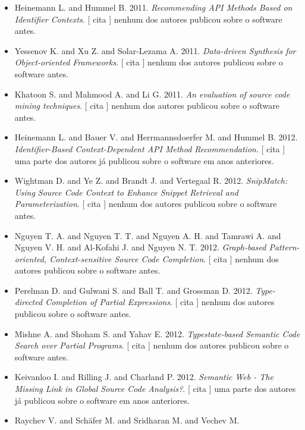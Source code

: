 \begin{itemize}
      [
          cita
      ]
nenhum dos autores publicou sobre o software antes.
\item Heinemann L. and Hummel B.
      2011.
        \textit{ Recommending API Methods Based on Identifier Contexts}.
      [
          cita
      ]
nenhum dos autores publicou sobre o software antes.
\item Yessenov K. and Xu Z. and Solar-Lezama A.
      2011.
        \textit{ Data-driven Synthesis for Object-oriented Frameworks}.
      [
          cita
      ]
nenhum dos autores publicou sobre o software antes.
\item Khatoon S. and Mahmood A. and Li G.
      2011.
        \textit{ An evaluation of source code mining techniques}.
      [
          cita
      ]
nenhum dos autores publicou sobre o software antes.
\item Heinemann L. and Bauer V. and Herrmannsdoerfer M. and Hummel B.
      2012.
        \textit{ Identifier-Based Context-Dependent API Method Recommendation}.
      [
          cita
      ]
uma parte dos autores já publicou sobre o software em anos anteriores.
\item Wightman D. and Ye Z. and Brandt J. and Vertegaal R.
      2012.
        \textit{ SnipMatch: Using Source Code Context to Enhance Snippet Retrieval and Parameterization}.
      [
          cita
      ]
nenhum dos autores publicou sobre o software antes.
\item Nguyen T. A. and Nguyen T. T. and Nguyen A. H. and Tamrawi A. and Nguyen V. H. and Al-Kofahi J. and Nguyen N. T.
      2012.
        \textit{ Graph-based Pattern-oriented, Context-sensitive Source Code Completion}.
      [
          cita
      ]
nenhum dos autores publicou sobre o software antes.
\item Perelman D. and Gulwani S. and Ball T. and Grossman D.
      2012.
        \textit{ Type-directed Completion of Partial Expressions}.
      [
          cita
      ]
nenhum dos autores publicou sobre o software antes.
\item Mishne A. and Shoham S. and Yahav E.
      2012.
        \textit{ Typestate-based Semantic Code Search over Partial Programs}.
      [
          cita
      ]
nenhum dos autores publicou sobre o software antes.
\item Keivanloo I. and Rilling J. and Charland P.
      2012.
        \textit{ Semantic Web - The Missing Link in Global Source Code Analysis?}.
      [
          cita
      ]
uma parte dos autores já publicou sobre o software em anos anteriores.
\item Raychev V. and Sch\"{a}fer M. and Sridharan M. and Vechev M.

\end{itemize}
